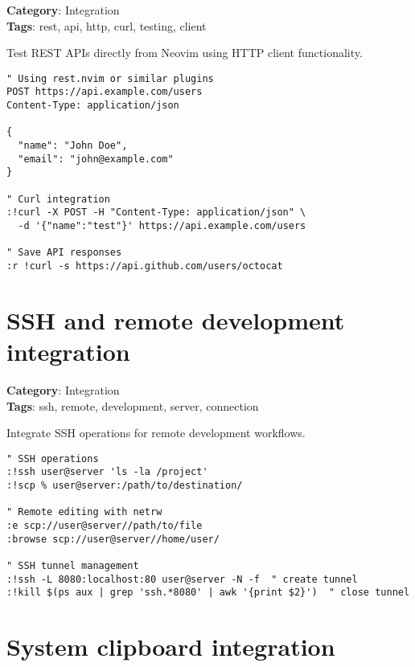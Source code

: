 {{{{{\textbf{Category}: Integration\\ \textbf{Tags}: rest, api, http, curl, testing, client
\vspace{0.5cm}

Test REST APIs directly from Neovim using HTTP client functionality.

\begin{Exa*}{}
\begin{Verbatim}[fontsize=\footnotesize, breaklines, breakanywhere]
" Using rest.nvim or similar plugins
POST https://api.example.com/users
Content-Type: application/json

{
  "name": "John Doe",
  "email": "john@example.com"
}

" Curl integration
:!curl -X POST -H "Content-Type: application/json" \
  -d '{"name":"test"}' https://api.example.com/users

" Save API responses
:r !curl -s https://api.github.com/users/octocat
\end{Verbatim}
\end{Exa*}

\section{SSH and remote development integration}

\textbf{Category}: Integration\\ \textbf{Tags}: ssh, remote, development, server, connection
\vspace{0.5cm}

Integrate SSH operations for remote development workflows.

\begin{Exa*}{}
\begin{Verbatim}[fontsize=\footnotesize, breaklines, breakanywhere]
" SSH operations
:!ssh user@server 'ls -la /project'
:!scp % user@server:/path/to/destination/

" Remote editing with netrw
:e scp://user@server//path/to/file
:browse scp://user@server//home/user/

" SSH tunnel management
:!ssh -L 8080:localhost:80 user@server -N -f  " create tunnel
:!kill $(ps aux | grep 'ssh.*8080' | awk '{print $2}')  " close tunnel
\end{Verbatim}
\end{Exa*}

\section{System clipboard integration}

}}}}}
